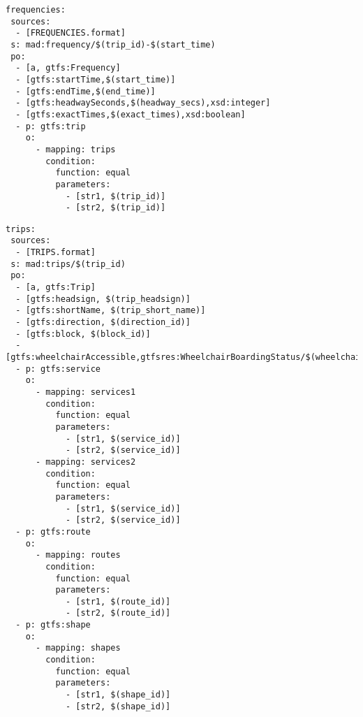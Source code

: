 \begin{lstlisting}[caption=Frequencies TripleMap, label=lst:frequencies, basicstyle=\ttfamily,frame=single]
frequencies:
 sources:
  - [FREQUENCIES.format]
 s: mad:frequency/$(trip_id)-$(start_time)
 po:
  - [a, gtfs:Frequency]
  - [gtfs:startTime,$(start_time)]
  - [gtfs:endTime,$(end_time)]
  - [gtfs:headwaySeconds,$(headway_secs),xsd:integer]
  - [gtfs:exactTimes,$(exact_times),xsd:boolean]
  - p: gtfs:trip
    o:
      - mapping: trips
        condition:
          function: equal
          parameters:
            - [str1, $(trip_id)]
            - [str2, $(trip_id)]
\end{lstlisting}
\newpage
\begin{lstlisting}[caption=Trips TripleMap, label=lst:trips, basicstyle=\ttfamily,frame=single]
trips:
 sources:
  - [TRIPS.format]
 s: mad:trips/$(trip_id)
 po:
  - [a, gtfs:Trip]
  - [gtfs:headsign, $(trip_headsign)]
  - [gtfs:shortName, $(trip_short_name)]
  - [gtfs:direction, $(direction_id)]
  - [gtfs:block, $(block_id)]
  - [gtfs:wheelchairAccessible,gtfsres:WheelchairBoardingStatus/$(wheelchair_accessible)~iri]
  - p: gtfs:service
    o:
      - mapping: services1
        condition:
          function: equal
          parameters:
            - [str1, $(service_id)]
            - [str2, $(service_id)]
      - mapping: services2
        condition:
          function: equal
          parameters:
            - [str1, $(service_id)]
            - [str2, $(service_id)]
  - p: gtfs:route
    o:
      - mapping: routes
        condition:
          function: equal
          parameters:
            - [str1, $(route_id)]
            - [str2, $(route_id)]
  - p: gtfs:shape
    o:
      - mapping: shapes
        condition:
          function: equal
          parameters:
            - [str1, $(shape_id)]
            - [str2, $(shape_id)]
\end{lstlisting}

